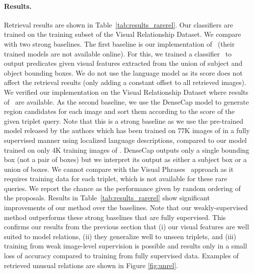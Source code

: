 \documentclass[10pt,twocolumn,letterpaper]{article}
\newcommand{\spaceparagraph}{\vspace{-.35cm}}
\begin{document}
\begin{figure*}[t]
    \setlength\abovecaptionskip{5pt}
    \caption{Top 3 retrieved pairs of boxes for a set of UnRel triplet queries (first line is best) with our weakly-supervised model. The pair is marked as positive (green) if the candidate subject and object boxes coincide with a ground truth subject and object boxes with $IoU \ge 0.3$. We provide more qualitative results in appendix.}
    \label{fig:unrel}
        \vspace{-.4cm}
\end{figure*}
   

\spaceparagraph
\paragraph{Results.}
Retrieval results are shown in Table~\ref{tab:results_rarerel}. Our classifiers are trained on the training subset of the Visual Relationship Dataset. 
We compare with two strong baselines. The first baseline is our implementation of~\cite{Lu16} (their trained models are not available online). For this, we trained a classifier~\cite{ren15} to output predicates given visual features extracted from the union of subject and object bounding boxes. We do not use the language model as its score does not affect the retrieval results (only adding a constant offset to all retrieved images). We verified our implementation on the Visual Relationship Dataset where results of~\cite{Lu16} are available. As the second baseline, we use the DenseCap \cite{Johnson2015} model to generate region candidates for each image and sort them according to the score of the given triplet query. Note that this is a strong baseline as we use the pre-trained model released by the authors which has been trained on 77K images of \cite{Krishna2016} in a fully supervised manner using localized language descriptions, compared to our model trained on only 4K training images of \cite{Lu16}. DenseCap outputs only a single bounding box (not a pair of boxes) but we interpret its output as either a subject box or a union of boxes. We cannot compare with the Visual Phrases~\cite{Sadeghi2011} approach as it requires training data for each triplet, which is not available for these rare queries. We report the chance as the performance given by random ordering of the proposals. Results in Table~\ref{tab:results_rarerel} show significant improvements of our method over the baselines. Note that our weakly-supervised method outperforms these strong baselines that are fully supervised. This confirms our results from the previous section that (i) our visual features are well suited to model relations, (ii) they generalize well to unseen triplets, and (iii)  training from weak image-level supervision is possible and results only in a small loss of accuracy compared to training from fully supervised data. Examples of retrieved unusual relations are shown in Figure \ref{fig:unrel}. 
\end{document}
